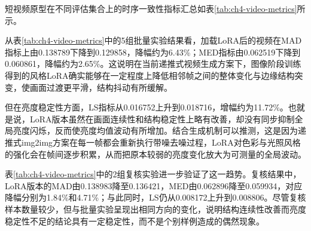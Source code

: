 短视频原型在不同评估集合上的时序一致性指标汇总如表\ref{tab:ch4-video-metrics}所示。

\begin{table}[htbp]
  \centering
  \caption{短视频原型时序一致性指标对比}
  \label{tab:ch4-video-metrics}
\end{table}

从表\ref{tab:ch4-video-metrics}中的5组批量实验结果看，加载LoRA后的视频在MAD指标上由0.138789下降到0.129858，降幅约为6.43\%；MED指标由0.062519下降到0.060861，降幅约为2.65\%。这说明在当前递推式视频生成方案下，图像阶段训练得到的风格LoRA确实能够在一定程度上降低相邻帧之间的整体变化与边缘结构突变，使画面过渡更平滑，结构抖动有所缓解。

但在亮度稳定性方面，LS指标从0.016752上升到0.018716，增幅约为11.72\%。也就是说，LoRA版本虽然在画面连续性和结构稳定性上略有改善，却没有同步抑制全局亮度闪烁，反而使亮度均值波动有所增加。结合生成机制可以推测，这是因为递推式img2img方案在每一帧都会重新执行带噪去噪过程，LoRA对色彩与光照风格的强化会在帧间逐步积累，从而把原本较弱的亮度变化放大为可测量的全局波动。

表\ref{tab:ch4-video-metrics}中的2组复核实验进一步验证了这一趋势。复核结果中，LoRA版本的MAD由0.138983降至0.136421，MED由0.062896降至0.059934，对应降幅分别为1.84\%和4.71\%；与此同时，LS仍从0.008172上升到0.008806。尽管复核样本数量较少，但与批量实验呈现出相同方向的变化，说明结构连续性改善而亮度稳定性不足的结论具有一定稳定性，而不是个别样例造成的偶然现象。

